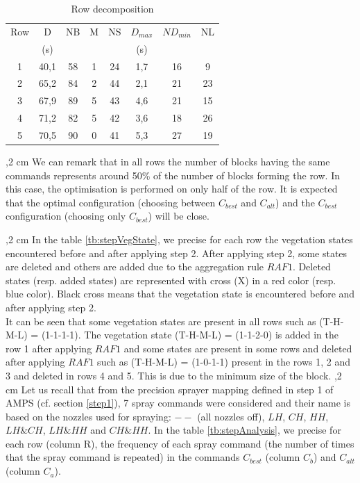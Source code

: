 \documentclass[preprint,3p,times,twocolumn]{elsarticle}
\begin{document}
\begin{table}[ht]
\begin{center}
\begin{tabular}{|c|c|c|c|c|c|c|c|}
\hline 
Row		&	D   &	NB      & M        &   NS	    & $D_{max}$  &   $N D_{min}$ & NL \\ 
		&	 (s)   &	      &         &       &  (s)  &   & \\ \hline
1		&   40,1	&	58      &   1       &   24      &	1,7                 &     16    &9\\ \hline
2		&	65,2    &	84      &   2       &   44     	&	2,1                 &    21     &23\\ \hline
3	    &	67,9	&	89      &   5       &   43      &	4,6                  &    21     &15\\ \hline
4   	&	71,2    &	82      &   5       &   42	    &	3,6                &    18     & 26\\ \hline
5	    &	70,5    &	90      &   0       &	41	    &	5,3                &    27     &	19\\ \hline
    
\end{tabular} 
\caption{Row decomposition}\label{tb:step2Aglae}
\end{center}
\end{table}

 ,2 cm
We can remark that in all rows the number of blocks having the same commands represents around 50\% of the number of blocks forming the row. In this case, the optimisation is performed on only half of the row. It is expected that the optimal configuration (choosing between $C_{best}$ and $C_{alt}$) and the $C_{best}$ configuration (choosing only $C_{best}$) will be close. 

,2 cm
In the table \ref{tb:stepVegState}, we precise for each row the vegetation states encountered before and after applying step 2.
After applying step 2, some states are deleted and others are added due to the aggregation rule $RAF1$. Deleted states (resp. added states) are represented with cross (X) in a red color (resp. blue color). Black cross means that the vegetation state is encountered before and after applying step 2. \\
It can be seen that some vegetation states are present in all rows such as (T-H-M-L) = (1-1-1-1). The vegetation state (T-H-M-L) = (1-1-2-0) is added in the row 1 after applying $RAF1$ and some states are present in some rows and deleted after applying $RAF1$ such as (T-H-M-L) = (1-0-1-1) present in the rows 1, 2 and 3 and deleted in rows 4 and 5. This is due to the minimum size of the block.
,2 cm
Let us recall that from the precision sprayer mapping defined in step 1 of AMPS (cf. section \ref{step1}), 7 spray commands were considered and their name is based on the nozzles used for spraying: $--$ (all nozzles off), $ LH $, $ CH $, $ HH $, $ LH \& CH $, $ LH \& HH $ and $ CH \& HH $. In the table \ref{tb:stepAnalysis}, we precise for each row (column R), the frequency of each spray command (the number of times that the spray command is repeated) in the commands $C_{best}$ (column $C_{b}$) and $C_{alt}$ (column $C_{a}$).
\end{document}
